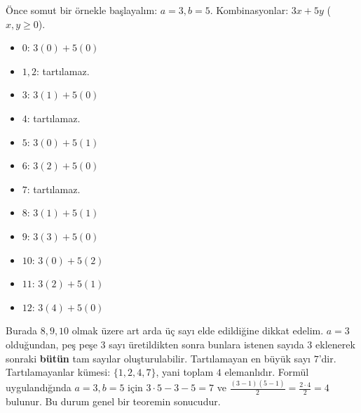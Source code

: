 Önce somut bir örnekle başlayalım: $a = 3, b = 5$.
Kombinasyonlar: $3x + 5y$ ($x, y \ge 0$).
\begin{itemize}
    \item $0$: $3(0) + 5(0)$
    \item $1, 2$: tartılamaz.
    \item $3$: $3(1) + 5(0)$
    \item $4$: tartılamaz.
    \item $5$: $3(0) + 5(1)$
    \item $6$: $3(2) + 5(0)$
    \item $7$: tartılamaz.
    \item $8$: $3(1) + 5(1)$
    \item $9$: $3(3) + 5(0)$
    \item $10$: $3(0) + 5(2)$
    \item $11$: $3(2) + 5(1)$
    \item $12$: $3(4) + 5(0)$
\end{itemize}
Burada $8, 9, 10$ olmak üzere art arda üç sayı elde edildiğine dikkat edelim. $a=3$ olduğundan, peş peşe 3 sayı üretildikten sonra bunlara istenen sayıda $3$ eklenerek sonraki \textbf{bütün} tam sayılar oluşturulabilir.
Tartılamayan en büyük sayı $7$'dir.
Tartılamayanlar kümesi: $\{1, 2, 4, 7\}$, yani toplam $4$ elemanlıdır.
Formül uygulandığında $a=3, b=5$ için $3 \cdot 5 - 3 - 5 = 7$ ve $\frac{(3-1)(5-1)}{2} = \frac{2 \cdot 4}{2} = 4$ bulunur. Bu durum genel bir teoremin sonucudur.

